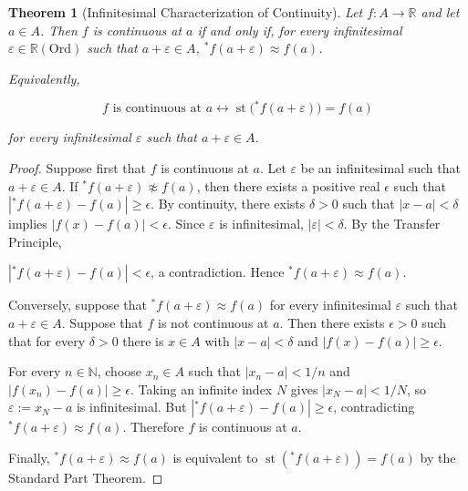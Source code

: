\documentclass[10pt,a4paper]{book}
\newtheorem{theorem}{Theorem}[section]
\begin{document}
\begin{theorem}[Infinitesimal Characterization of Continuity]

    Let $f:A\to\mathbb R$ and let $a\in A$. Then $f$ is continuous at $a$ if and
    only if, for every infinitesimal $\varepsilon\in\mathbb R(\mathrm{Ord})$ such
    that $a+\varepsilon\in A$, ${}^*f(a+\varepsilon)\approx f(a)$.

    Equivalently,

    \[
        f\text{ is continuous at }a
        \leftrightarrow
        \operatorname{st}\bigl({}^*f(a+\varepsilon)\bigr)=f(a)
    \]

    for every infinitesimal $\varepsilon$ such that $a+\varepsilon\in A$.

\end{theorem}

\begin{proof}

    Suppose first that $f$ is continuous at $a$. Let $\varepsilon$ be an
    infinitesimal such that $a+\varepsilon\in A$. If
    ${}^*f(a+\varepsilon)\not\approx f(a)$, then there exists a positive real
    $\epsilon$ such that $|{}^*f(a+\varepsilon)-f(a)|\geq\epsilon$. By continuity,
    there exists $\delta>0$ such that $|x-a|<\delta$ implies
    $|f(x)-f(a)|<\epsilon$. Since $\varepsilon$ is infinitesimal,
    $|\varepsilon|<\delta$. By the Transfer Principle,

    $|{}^*f(a+\varepsilon)-f(a)|<\epsilon$, a contradiction. Hence
    ${}^*f(a+\varepsilon)\approx f(a)$.

    Conversely, suppose that ${}^*f(a+\varepsilon)\approx f(a)$ for every
    infinitesimal $\varepsilon$ such that $a+\varepsilon\in A$. Suppose that $f$ is
    not continuous at $a$. Then there exists $\epsilon>0$ such that for every
    $\delta>0$ there is $x\in A$ with $|x-a|<\delta$ and $|f(x)-f(a)|\geq\epsilon$.

    For every $n\in\mathbb N$, choose $x_n\in A$ such that $|x_n-a|<1/n$ and
    $|f(x_n)-f(a)|\geq\epsilon$. Taking an infinite index $N$ gives $|x_N-a|<1/N$,
    so $\varepsilon:=x_N-a$ is infinitesimal. But
    $|{}^*f(a+\varepsilon)-f(a)|\geq\epsilon$, contradicting
    ${}^*f(a+\varepsilon)\approx f(a)$. Therefore $f$ is continuous at $a$.

    Finally, ${}^*f(a+\varepsilon)\approx f(a)$ is equivalent to
    $\operatorname{st}({}^*f(a+\varepsilon))=f(a)$ by the Standard Part Theorem.

\end{proof}
\end{document}
